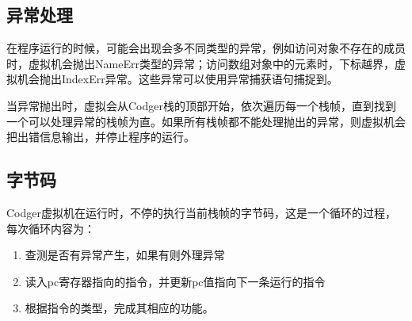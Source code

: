 \subsection{异常处理}
在程序运行的时候，可能会出现会多不同类型的异常，例如访问对象不存在的成员时，虚拟机会抛出NameErr类型的异常；访问数组对象中的元素时，下标越界，虚拟机会抛出IndexErr异常。这些异常可以使用异常捕获语句捕捉到。

当异常抛出时，虚拟会从Codger栈的顶部开始，依次遍历每一个栈帧，直到找到一个可以处理异常的栈帧为直。如果所有栈帧都不能处理抛出的异常，则虚拟机会把出错信息输出，并停止程序的运行。
\subsection{字节码}
Codger虚拟机在运行时，不停的执行当前栈帧的字节码，这是一个循环的过程，每次循环内容为：
\begin{enumerate}
\item 查测是否有异常产生，如果有则外理异常
\item 读入pc寄存器指向的指令，并更新pc值指向下一条运行的指令
\item 根据指令的类型，完成其相应的功能。
\end{enumerate}

